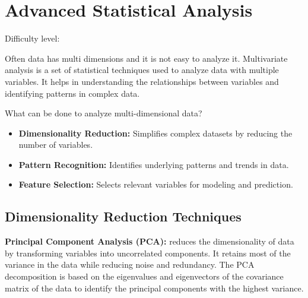 \documentclass[
  letterpaper,
  DIV=11,
  numbers=noendperiod]{scrreprt}
\providecommand{\tightlist}{%
  \setlength{\itemsep}{0pt}\setlength{\parskip}{0pt}}\usepackage{longtable,booktabs,array}
\begin{document}
\chapter{Advanced Statistical
Analysis}\label{advanced-statistical-analysis}

Difficulty level: { }

Often data has multi dimensions and it is not easy to analyze it.
Multivariate analysis is a set of statistical techniques used to analyze
data with multiple variables. It helps in understanding the
relationships between variables and identifying patterns in complex
data.

What can be done to analyze multi-dimensional data?

\begin{itemize}
\tightlist
\item
  \textbf{Dimensionality Reduction:} Simplifies complex datasets by
  reducing the number of variables.
\item
  \textbf{Pattern Recognition:} Identifies underlying patterns and
  trends in data.
\item
  \textbf{Feature Selection:} Selects relevant variables for modeling
  and prediction.
\end{itemize}

\section*{Dimensionality Reduction
Techniques}\label{dimensionality-reduction-techniques}


\textbf{Principal Component Analysis (PCA):} reduces the dimensionality
of data by transforming variables into uncorrelated components. It
retains most of the variance in the data while reducing noise and
redundancy. The PCA decomposition is based on the eigenvalues and
eigenvectors of the covariance matrix of the data to identify the
principal components with the highest variance.
\end{document}
